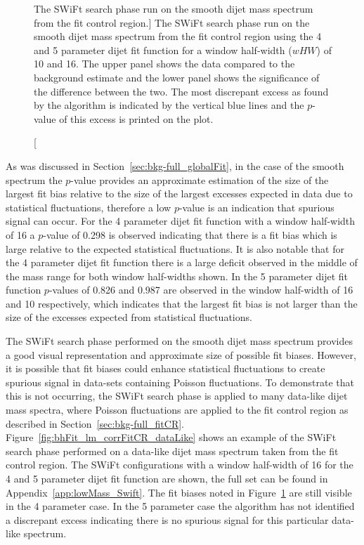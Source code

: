 \begin{figure}[!htb]
\caption
    [The SWiFt search phase run on the smooth dijet mass spectrum from the \lm{} fit control region.]
    {\label{fig:bhFit_lm_corrFitCR_smooth}
      The SWiFt search phase run on the smooth dijet mass spectrum from the \lm{} fit control region
      using the 4 and 5 parameter dijet fit function for a window half-width ($wHW$) of 10 and 16.
      The upper panel shows the data compared to the background estimate and the lower panel shows the significance of the difference between the two.
      The most discrepant excess as found by the \bh{} algorithm is indicated by the vertical blue lines and the \mbox{$p$-value} of this excess is printed on the plot. }
\end{figure}

As was discussed in Section~\ref{sec:bkg-full_globalFit}, in the case of the smooth spectrum the \bh{} \mbox{$p$-value} provides an approximate estimation
of the size of the largest fit bias relative to the size of the largest excesses expected in data due to statistical fluctuations,
therefore a low $p$-value is an indication that spurious signal can occur. 
For the 4 parameter dijet fit function with a window half-width of 16 a \bh{} $p$-value of 0.298 is observed indicating that
there is a fit bias which is large relative to the expected statistical fluctuations.
It is also notable that for the 4 parameter dijet fit function there is a large deficit observed in the middle of the mass range for both window half-widths shown.
In the 5 parameter dijet fit function \bh{} $p$-values of 0.826 and 0.987 are observed in the window half-width of 16 and 10 respectively,
which indicates that the largest fit bias is not larger than the size of the excesses expected from statistical fluctuations.

The SWiFt search phase performed on the smooth dijet mass spectrum provides a good visual representation and approximate size of possible fit biases.
However, it is possible that fit biases could enhance statistical fluctuations to create spurious signal in data-sets containing Poisson fluctuations.
To demonstrate that this is not occurring, the SWiFt search phase is applied to many data-like dijet mass spectra,
where Poisson fluctuations are applied to the fit control region as described in Section~\ref{sec:bkg-full_fitCR}.
Figure~\ref{fig:bhFit_lm_corrFitCR_dataLike} shows an example of the SWiFt search phase performed on a data-like dijet mass spectrum taken from the fit control region.
The SWiFt configurations with a window half-width of 16 for the 4 and 5 parameter dijet fit function are shown, the full set can be found in Appendix~\ref{app:lowMass_Swift}.
The fit biases noted in Figure~\ref{fig:bhFit_lm_corrFitCR_smooth} are still visible in the 4 parameter case.
In the 5 parameter case the \bh{} algorithm has not identified a discrepant excess indicating
there is no spurious signal for this particular data-like spectrum.

